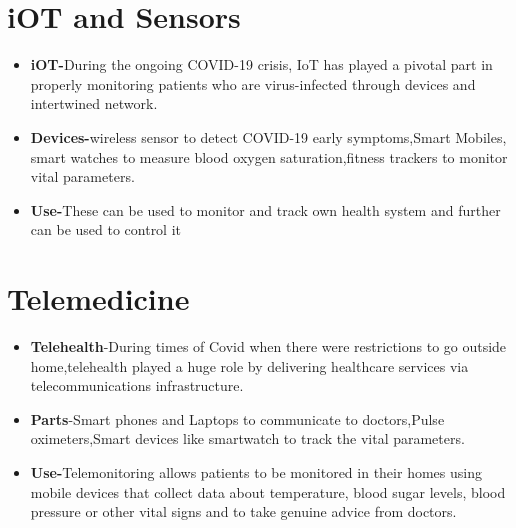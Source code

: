 \documentclass[12pt]{article}
\begin{document}
\section{iOT and Sensors}
\begin{itemize}


\item \textbf{iOT-}During the ongoing COVID-19 crisis, IoT has played a pivotal part in properly monitoring patients who are virus-infected through devices and intertwined network.

\item \textbf{Devices-}wireless sensor to detect COVID-19 early symptoms,Smart Mobiles, smart watches to measure blood oxygen saturation,fitness trackers to monitor vital parameters.

\item \textbf{Use-}These can be used to monitor and track own health system and further can be used to control it




\end{itemize}



\section{Telemedicine}

\begin{itemize}

\item \textbf{Telehealth}-During times of Covid when there were restrictions to go outside home,telehealth played a huge role by delivering healthcare services via telecommunications infrastructure.

\item \textbf{Parts}-Smart phones and Laptops to communicate to doctors,Pulse oximeters,Smart devices like smartwatch  to track the vital parameters.

\item \textbf{Use-}Telemonitoring allows patients to be monitored in their homes using
mobile devices that collect data about temperature, blood sugar levels,
blood pressure or other vital signs and to take genuine advice from doctors.


\end{itemize}
\end{document}
